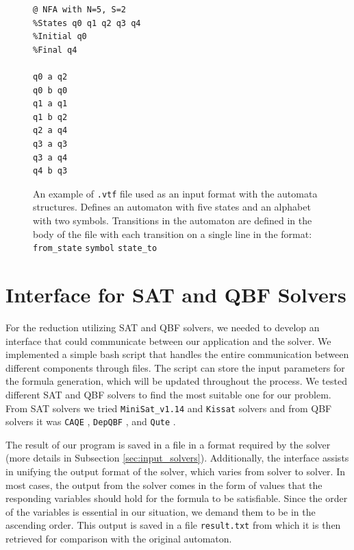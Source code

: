 \begin{figure}[!hbt]
\label{fig:vtf_example}
\begin{verbatim}
@ NFA with N=5, S=2
%States q0 q1 q2 q3 q4
%Initial q0
%Final q4

q0 a q2
q0 b q0
q1 a q1
q1 b q2
q2 a q4
q3 a q3
q3 a q4
q4 b q3
\end{verbatim}
\caption{An example of \texttt{.vtf} file used as an input format with the automata structures. Defines an automaton with five states and an alphabet with two symbols. Transitions in the automaton are defined in the body of the file with each transition on a single line in the format: \texttt{from\_state} \texttt{symbol} \texttt{state\_to}}
\end{figure}


\section{Interface for SAT and QBF Solvers}
For the reduction utilizing SAT and QBF solvers, we needed to develop an interface that could communicate between our application and the solver. We implemented a simple bash script that handles the entire communication between different components through files. The script can store the input parameters for the formula generation, which will be updated throughout the process. We tested different SAT and QBF solvers to find the most suitable one for our problem. From SAT solvers we tried \texttt{MiniSat\_v1.14} \cite{MiniSat_page} and  \texttt{Kissat} \cite{Kissat_page} solvers and from QBF solvers it was \texttt{CAQE} \cite{CAQE_page}, \texttt{DepQBF} \cite{DepQBF_page}, and \texttt{Qute} \cite{QUTE_page}.

The result of our program is saved in a file in a format required by the solver (more details in Subsection \ref{sec:input_solvers}). Additionally, the interface assists in unifying the output format of the solver, which varies from solver to solver. In most cases, the output from the solver comes in the form of values that the responding variables should hold for the formula to be satisfiable. Since the order of the variables is essential in our situation, we demand them to be in the ascending order. This output is saved in a file \verb|result.txt| from which it is then retrieved for comparison with the original automaton.

